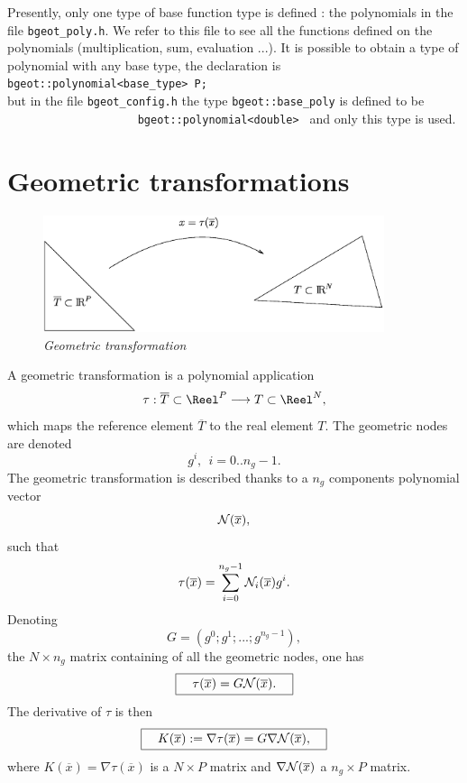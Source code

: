 \documentclass[11pt,a4paper]{article}
\begin{document}
Presently, only one type of base function type is defined : the polynomials in the file {\tt bgeot\_poly.h}. We refer to this file to see all the functions defined on the polynomials (multiplication, sum, evaluation ...). It is possible to obtain a type of polynomial with any base type, the declaration is\\[0.5cm]
{\tt bgeot::polynomial<base\_type> P;}\\[0.5cm]
but in the file  {\tt bgeot\_config.h} the type  {\tt bgeot::base\_poly} is defined to be $\hspace{10em}$ {\tt bgeot::polynomial<double> } and only this type is used.

\section{Geometric transformations}

\begin{figure}[htb]
  \begin{center}
    \includegraphics[width=10cm,angle=0]{getfemelem_trans.eps}
  \end{center}
  \caption{ \it Geometric transformation }
  \label{fig:transgeo}
\end{figure}

A geometric transformation is a polynomial application
$$ \tau : \overline{T} \subset \Reel^P \longrightarrow T \subset\Reel^N, $$
which maps the reference element $\overline{T}$ to the real element $T$.
The geometric nodes are denoted
$$ g^i, \ \ i = 0 .. n_g - 1. $$
The geometric transformation is described thanks to a $n_g$ components polynomial vector
$$ {\cal N}(\overline{x}), $$
such that
$$ \tau(\overline{x}) = \sum_{i = 0}^{n_g - 1} {\cal N}_i(\overline{x}) g^i.$$
Denoting
$$ G = (g^0; g^1; ...; g^{n_g - 1}), $$
the $N \times n_g$ matrix containing of all the geometric nodes, one has
$$ \fbox{$\hspace{1em}\tau(\overline{x}) = G {\cal N}(\overline{x}).\hspace{1em}$} $$
The derivative of $\tau$ is then
$$ \fbox{$\hspace{1em} K(\overline{x}) := \nabla \tau(\overline{x}) = G \nabla {\cal N}(\overline{x}),\hspace{1em}$} $$
where $K(\overline{x}) = \nabla \tau(\overline{x})$ is a $N \times P$ matrix and $\nabla {\cal N}(\overline{x})$ a $n_g \times P$ matrix.
\end{document}

